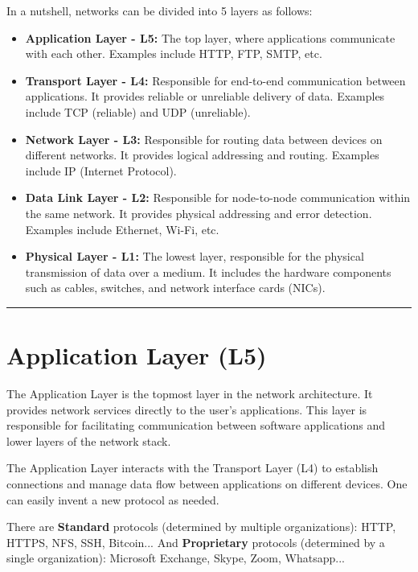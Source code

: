 \documentclass[openany,12pt]{book}
\begin{document}
In a nutshell, networks can be divided into 5 layers as follows:
\begin{itemize}
  \item \textbf{Application Layer - L5:} The top layer, where applications communicate with each other. Examples include HTTP, FTP, SMTP, etc.
  \item \textbf{Transport Layer - L4:} Responsible for end-to-end communication between applications. It provides reliable or unreliable delivery of data. Examples include TCP (reliable) and UDP (unreliable).
  \item \textbf{Network Layer - L3:} Responsible for routing data between devices on different networks. It provides logical addressing and routing. Examples include IP (Internet Protocol).
  \item \textbf{Data Link Layer - L2:} Responsible for node-to-node communication within the same network. It provides physical addressing and error detection. Examples include Ethernet, Wi-Fi, etc.
  \item \textbf{Physical Layer - L1:} The lowest layer, responsible for the physical transmission of data over a medium. It includes the hardware components such as cables, switches, and network interface cards (NICs).
\end{itemize}


\noindent\rule{\linewidth}{0.5pt}

\section*{Application Layer (L5)}

The Application Layer is the topmost layer in the network architecture. It provides network services directly to the user's applications. This layer is responsible for facilitating communication between software applications and lower layers of the network stack.

The Application Layer interacts with the Transport Layer (L4) to establish connections and manage data flow between applications on different devices. One can easily invent a new protocol as needed.

There are \textbf{Standard} protocols (determined by multiple organizations): HTTP, HTTPS, NFS, SSH, Bitcoin...
And \textbf{Proprietary} protocols (determined by a single organization): Microsoft Exchange, Skype, Zoom, Whatsapp...
\end{document}
